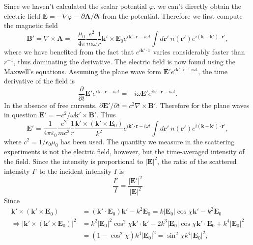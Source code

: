 Since we haven't calculated the scalar potential $\varphi$, we can't directly obtain the electric field $\mathbf{E} = -\nabla \varphi - \partial \mathbf{A}/ \partial t$ from the potential.  Therefore we first compute the magnetic field
\begin{equation}
\mathbf{B}' = \nabla \times \mathbf{A} = -\frac{\mu_0}{4 \pi} \frac{e^2}{m\omega}\frac{1}{r} \mathbf{k}' \times \mathbf{E}_0  e^{i \mathbf{k}'\cdot\mathbf{r}-i \omega t} \int d\mathbf{r}' \  n(\mathbf{r}')  e^{i (\mathbf{k}-\mathbf{k}')\cdot\mathbf{r}'},
\end{equation}
where we have benefited from the fact that $e^{i \mathbf{k}'\cdot\mathbf{r}}$ varies considerably faster than $r^{-1}$, thus dominating the derivative. The electric field is now found using the Maxwell's equations. Assuming the plane wave form $\mathbf{E}' e^{i \mathbf{k}'\cdot\mathbf{r}-i \omega t}$, the time derivative of the field is
\begin{equation}
\frac{\partial}{\partial t} \mathbf{E}' e^{i \mathbf{k}'\cdot\mathbf{r}-i \omega t}
= -i \omega \mathbf{E}' e^{i \mathbf{k}'\cdot\mathbf{r}-i \omega t}.
\end{equation}
In the absence of free currents, $\partial \mathbf{E}' /\partial t = c^2 \nabla \times \mathbf{B}'$. Therefore for the plane waves in question $\mathbf{E}' = -c^2/\omega \mathbf{k}' \times \mathbf{B}'$. Thus
\begin{equation}
\mathbf{E}' = \frac{1}{4 \pi \varepsilon_0} \frac{e^2}{mc^2}\frac{1}{r} \frac{\mathbf{k}' \times(\mathbf{k}' \times \mathbf{E}_0)}{k^2}  e^{i \mathbf{k}'\cdot\mathbf{r}-i \omega t} \int d\mathbf{r}' \  n(\mathbf{r}')  e^{i (\mathbf{k}-\mathbf{k}')\cdot\mathbf{r}'},
\end{equation}
where $c^2 = 1/\epsilon_0 \mu_0$ has been used. 
The quantity we measure in the scattering experiments is not the electric field, however, but the time-averaged intensity of the field. Since the intensity is proportional to $|\mathbf{E}|^2$, the ratio of the scattered intensity $I$' to the incident intensity $I$ is  
\begin{equation}
\frac{I'}{I} =  \frac{|\mathbf{E}'|^2}{|\mathbf{E}|^2}
\end{equation}
Since 
\begin{align}
\mathbf{k}' \times(\mathbf{k}' \times \mathbf{E}_0) &= (\mathbf{k}'\cdot \mathbf{E}_0)\mathbf{k}' - k^2 \mathbf{E}_0 = k |\mathbf{E}_0| \cos \chi \mathbf{k}'  - k^2 \mathbf{E}_0 \nonumber \\ \Rightarrow
|\mathbf{k}' \times(\mathbf{k}' \times \mathbf{E}_0)|^2 &=
k^2 |\mathbf{E}_0|^2 \cos^2 \chi \mathbf{k}' \cdot \mathbf{k}'
-2 k^3 |\mathbf{E}_0| \cos \chi \mathbf{k}'\cdot \mathbf{E}_0 + k^4 |\mathbf{E}_0|^2 \nonumber \\
&= (1 - \cos^2 \chi) k^4 |\mathbf{E}_0|^2 = \sin^2 \chi k^4 |\mathbf{E}_0|^2,
\end{align}

